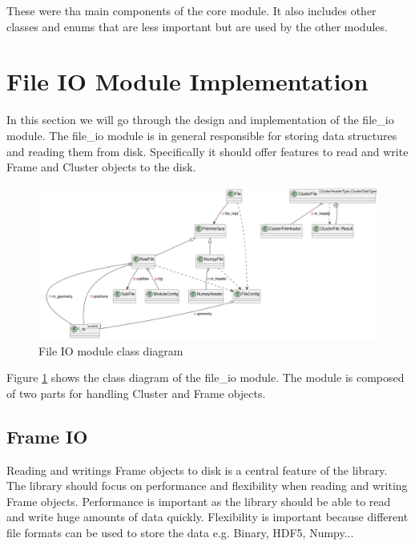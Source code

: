 \documentclass[./chapitre3.tex]{subfiles}
\begin{document}
These were tha main components of the core module. It also includes other classes and enums that are less important
but are used by the other modules.







\section{File IO Module Implementation}
In this section we will go through the design and implementation of the file\_io module.
The file\_io module is in general responsible for storing data structures and reading them from disk.
Specifically it should offer features to read and write Frame and Cluster objects to the disk.\\

\begin{figure}
    \centering
    \includegraphics[width=\textwidth]{Chapitre3/figures/file_io_class.png}
    \caption{File IO module class diagram}
    \label{fig:file_io_class}
\end{figure}
Figure \ref{fig:file_io_class} shows the class diagram of the file\_io module.
The module is composed of two parts for handling Cluster  and Frame objects.\\

\subsection{Frame IO}
Reading and writings Frame objects to disk is a central feature of the library. The library
should focus on performance and flexibility when reading and writing Frame objects.
Performance is important as the library should be able to read and write huge amounts of data
quickly. Flexibility is important because different file formats can be used to store the data e.g.
Binary, HDF5, Numpy...\\
\end{document}
